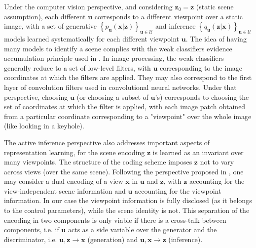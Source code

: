 \documentclass{article} %
\begin{document}

Under the computer vision perspective, and considering $\boldsymbol{z}_0 = \boldsymbol{z}$ (static scene assumption), each different $\boldsymbol{u}$ corresponds to a different viewpoint over a static image, with a set of generative
$ \left\{p_{\boldsymbol{u}}(\boldsymbol{x}|\boldsymbol{z})\right\}_{\boldsymbol{u}\in\mathcal{U}}$
and inference
$ \left\{q_{\boldsymbol{u}}(\boldsymbol{z}|\boldsymbol{x})\right\}_{\boldsymbol{u}\in\mathcal{U}}$ 
models learned systematically for each different viewpoint $\boldsymbol{u}$. The idea of having many models to identify a scene complies with the weak classifiers evidence accumulation principle used in \cite{viola2003fast}. In image processing, the weak classifiers generally reduce to a set of low-level filters, with $\boldsymbol{u}$ corresponding to the image coordinates at which the filters are applied. They may also correspond to the first layer of convolution filters used in convolutional neural networks. Under that perspective, choosing $\boldsymbol{u}$ (or choosing a subset of $\boldsymbol{u}$'s) corresponds to choosing the set of coordinates at which the filter is applied, with each image patch obtained from a particular coordinate corresponding to a "viewpoint" over the whole image (like looking in a keyhole). 

The active inference perspective also addresses important aspects of representation learning, for the scene encoding $\boldsymbol{z}$ is learned as an invariant over many viewpoints.  The structure of the coding scheme imposes $\boldsymbol{z}$ not to vary across views (over the same scene). Following the   perspective proposed in \cite{bengio2017independently}, one may consider a dual encoding of a view $\boldsymbol{x}$ in $\boldsymbol{u}$ and $\boldsymbol{z}$, with $\boldsymbol{z}$ accounting for the view-independent scene information and $\boldsymbol{u}$ accounting for the viewpoint information. In our case the viewpoint information is fully disclosed (as it belongs to the control parameters), while the scene identity is not. This separation of the encoding in two components is only viable if there is a cross-talk between components, i.e. if $\boldsymbol{u}$ %
acts as a side variable over the generator and the discriminator, i.e. $\boldsymbol{u}, \boldsymbol{z} \rightarrow \boldsymbol{x}$ (generation) and $\boldsymbol{u}, \boldsymbol{x} \rightarrow \boldsymbol{z}$ (inference). 
\end{document}
